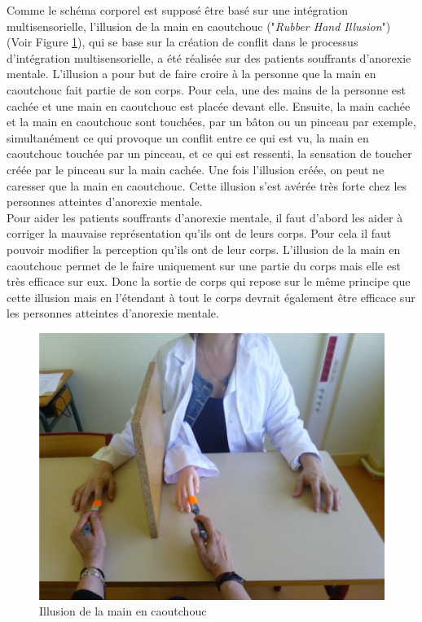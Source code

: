  Comme le schéma corporel est supposé être basé sur une intégration multisensorielle, l'illusion de la main en caoutchouc ("\emph{Rubber Hand Illusion}") \cite{Bo98} (Voir Figure \ref{fig1}), qui se base sur la création de conflit dans le processus d'intégration multisensorielle, a été réalisée sur des patients souffrants d'anorexie mentale. L'illusion a pour but de faire croire à la personne que la main en caoutchouc fait partie de son corps. Pour cela, une des mains de la personne est cachée et une main en caoutchouc est placée devant elle. Ensuite, la main cachée et la main en caoutchouc sont touchées, par un bâton ou un pinceau par exemple, simultanément ce qui provoque un conflit entre ce qui est vu, la main en caoutchouc touchée par un pinceau, et ce qui est ressenti, la sensation de toucher créée par le pinceau sur la main cachée. Une fois l'illusion créée, on peut ne caresser que la main en caoutchouc. Cette illusion s'est avérée très forte chez les personnes atteintes d'anorexie mentale.\\

Pour aider les patients souffrants d'anorexie mentale, il faut d'abord les aider à corriger la mauvaise représentation qu'ils ont de leurs corps. Pour cela il faut pouvoir modifier la perception qu'ils ont de leur corps. L'illusion de la main en caoutchouc permet de le faire uniquement sur une partie du corps mais elle est très efficace sur eux. Donc la sortie de corps qui repose sur le même principe que cette illusion mais en l'étendant à tout le corps devrait également être efficace sur les personnes atteintes d'anorexie mentale.
\begin{figure}[h]
   	\centerline{\includegraphics[scale=0.4]{images/biblio/rubberhand}}
   	\caption{\label{fig1} Illusion de la main en caoutchouc \cite{lu14}}
\end{figure}


